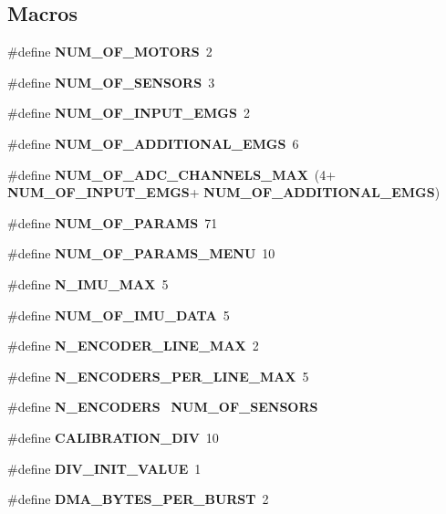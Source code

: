 \subsection*{Macros}
\begin{DoxyCompactItemize}
\item 
\#define \textbf{ N\+U\+M\+\_\+\+O\+F\+\_\+\+M\+O\+T\+O\+RS}~2
\item 
\#define \textbf{ N\+U\+M\+\_\+\+O\+F\+\_\+\+S\+E\+N\+S\+O\+RS}~3
\item 
\#define \textbf{ N\+U\+M\+\_\+\+O\+F\+\_\+\+I\+N\+P\+U\+T\+\_\+\+E\+M\+GS}~2
\item 
\#define \textbf{ N\+U\+M\+\_\+\+O\+F\+\_\+\+A\+D\+D\+I\+T\+I\+O\+N\+A\+L\+\_\+\+E\+M\+GS}~6
\item 
\mbox{\label{globals_8h_a94a49570e3bc73b67084f1a9ae90d89a}} 
\#define {\bfseries N\+U\+M\+\_\+\+O\+F\+\_\+\+A\+D\+C\+\_\+\+C\+H\+A\+N\+N\+E\+L\+S\+\_\+\+M\+AX}~(4+\textbf{ N\+U\+M\+\_\+\+O\+F\+\_\+\+I\+N\+P\+U\+T\+\_\+\+E\+M\+GS}+\textbf{ N\+U\+M\+\_\+\+O\+F\+\_\+\+A\+D\+D\+I\+T\+I\+O\+N\+A\+L\+\_\+\+E\+M\+GS})
\item 
\#define \textbf{ N\+U\+M\+\_\+\+O\+F\+\_\+\+P\+A\+R\+A\+MS}~71
\item 
\#define \textbf{ N\+U\+M\+\_\+\+O\+F\+\_\+\+P\+A\+R\+A\+M\+S\+\_\+\+M\+E\+NU}~10
\item 
\mbox{\label{globals_8h_a8e4d7a571850d3268c9b780b171474e6}} 
\#define {\bfseries N\+\_\+\+I\+M\+U\+\_\+\+M\+AX}~5
\item 
\mbox{\label{globals_8h_a7016adad486a9166338f1667813d8b5c}} 
\#define {\bfseries N\+U\+M\+\_\+\+O\+F\+\_\+\+I\+M\+U\+\_\+\+D\+A\+TA}~5
\item 
\#define \textbf{ N\+\_\+\+E\+N\+C\+O\+D\+E\+R\+\_\+\+L\+I\+N\+E\+\_\+\+M\+AX}~2
\item 
\#define \textbf{ N\+\_\+\+E\+N\+C\+O\+D\+E\+R\+S\+\_\+\+P\+E\+R\+\_\+\+L\+I\+N\+E\+\_\+\+M\+AX}~5
\item 
\mbox{\label{globals_8h_a3b87e4129f51a9ee36bdfb06ea0a9268}} 
\#define {\bfseries N\+\_\+\+E\+N\+C\+O\+D\+E\+RS}~\textbf{ N\+U\+M\+\_\+\+O\+F\+\_\+\+S\+E\+N\+S\+O\+RS}
\item 
\#define \textbf{ C\+A\+L\+I\+B\+R\+A\+T\+I\+O\+N\+\_\+\+D\+IV}~10
\item 
\#define \textbf{ D\+I\+V\+\_\+\+I\+N\+I\+T\+\_\+\+V\+A\+L\+UE}~1
\item 
\mbox{\label{globals_8h_abf6c9afec04b86961e177e0646401ace}} 
\#define {\bfseries D\+M\+A\+\_\+\+B\+Y\+T\+E\+S\+\_\+\+P\+E\+R\+\_\+\+B\+U\+R\+ST}~2
\item 

\end{DoxyCompactItemize}
